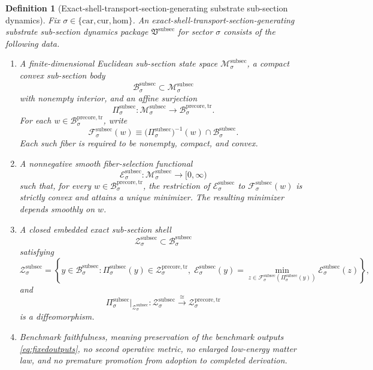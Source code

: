 \documentclass[11pt]{article}
\newcommand{\Car}{\mathrm{car}}
\newcommand{\Cur}{\mathrm{cur}}
\newcommand{\Hom}{\mathrm{hom}}
\newcommand{\PreCoreTrBody}[1]{\mathcal B_{#1}^{\mathrm{precore,tr}}}
\newcommand{\PreCoreTrShell}[1]{\mathcal Z_{#1}^{\mathrm{precore,tr}}}
\newcommand{\SubSectionPackage}{\mathfrak V^{\mathrm{subsec}}}
\newcommand{\SubSectionSpace}[1]{\mathcal M_{#1}^{\mathrm{subsec}}}
\newcommand{\SubSectionBody}[1]{\mathcal B_{#1}^{\mathrm{subsec}}}
\newcommand{\SubSectionProj}[1]{\Pi_{#1}^{\mathrm{subsec}}}
\newcommand{\SubSectionFunctional}[1]{\mathscr E_{#1}^{\mathrm{subsec}}}
\newcommand{\SubSectionFiber}[2]{\mathcal F_{#1}^{\mathrm{subsec}}(#2)}
\newcommand{\SubSectionShell}[1]{\mathcal Z_{#1}^{\mathrm{subsec}}}
\newtheorem{definition}{Definition}
\begin{document}
\begin{definition}[Exact-shell-transport-section-generating substrate sub-section dynamics]
\label{def:subsec}
Fix \(\sigma\in\{\Car,\Cur,\Hom\}\). An \emph{exact-shell-transport-section-generating substrate sub-section dynamics package} \(\SubSectionPackage\) for sector \(\sigma\) consists of the following data.
\begin{enumerate}
    \item A finite-dimensional Euclidean sub-section state space \(\SubSectionSpace{\sigma}\), a compact convex sub-section body
    \[
    \SubSectionBody{\sigma}\subset\SubSectionSpace{\sigma}
    \]
    with nonempty interior, and an affine surjection
    \[
    \SubSectionProj{\sigma}:\SubSectionSpace{\sigma}\to\PreCoreTrBody{\sigma}.
    \]
    For each \(w\in\PreCoreTrBody{\sigma}\), write
    \[
    \SubSectionFiber{\sigma}{w}
    \equiv
    \bigl(\SubSectionProj{\sigma}\bigr)^{-1}(w)\cap\SubSectionBody{\sigma}.
    \]
    Each such fiber is required to be nonempty, compact, and convex.
    \item A nonnegative smooth fiber-selection functional
    \[
    \SubSectionFunctional{\sigma}:\SubSectionSpace{\sigma}\to[0,\infty)
    \]
    such that, for every \(w\in\PreCoreTrBody{\sigma}\), the restriction of \(\SubSectionFunctional{\sigma}\) to \(\SubSectionFiber{\sigma}{w}\) is strictly convex and attains a unique minimizer. The resulting minimizer depends smoothly on \(w\).
    \item A closed embedded exact sub-section shell
    \[
    \SubSectionShell{\sigma}\subset\SubSectionBody{\sigma}
    \]
    satisfying
    \[
    \SubSectionShell{\sigma}
    =
    \left\{
    y\in\SubSectionBody{\sigma}:
    \SubSectionProj{\sigma}(y)\in\PreCoreTrShell{\sigma},
    \;
    \SubSectionFunctional{\sigma}(y)
    =
    \min_{z\in\SubSectionFiber{\sigma}{\SubSectionProj{\sigma}(y)}}
    \SubSectionFunctional{\sigma}(z)
    \right\},
    \]
    and
    \[
    \SubSectionProj{\sigma}\big|_{\SubSectionShell{\sigma}}
    :
    \SubSectionShell{\sigma}
    \xrightarrow{\cong}
    \PreCoreTrShell{\sigma}
    \]
    is a diffeomorphism.
    \item Benchmark faithfulness, meaning preservation of the benchmark outputs \eqref{eq:fixedoutputs}, no second operative metric, no enlarged low-energy matter law, and no premature promotion from adoption to completed derivation.
\end{enumerate}
\end{definition}
\end{document}
